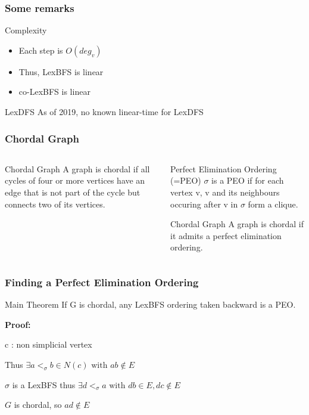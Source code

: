 \documentclass{beamer}
\begin{document}
\begin{frame}\frametitle{Some remarks}
    \begin{block}{Complexity}
	\begin{itemize}
	    \item Each step is $O(deg_{v})$
            \item Thus, LexBFS is linear
	    \item co-LexBFS is linear
	\end{itemize}
    \end{block}
    \begin{alertblock}{LexDFS}
	As of 2019, no known linear-time for LexDFS
    \end{alertblock}
\end{frame}

\begin{frame}\frametitle{Chordal Graph}

\begin{columns}[T] %
\begin{column}{.48\textwidth}

	\begin{block}{Chordal Graph}
		A graph is chordal if all cycles of four or more vertices have an edge that is not part of the cycle but connects two of its vertices.
	\end{block}

\end{column}%
\hfill%
\begin{column}{.48\textwidth}

	\begin{block}{Perfect Elimination Ordering (=PEO)}
	$\sigma$ is a PEO if for each vertex v, v and its neighbours occuring after v in $\sigma$ form a clique.
	\end{block}

	\begin{block}{Chordal Graph}
		A graph is chordal if it admits a perfect elimination ordering.
	\end{block}
\end{column}
\end{columns}
\end{frame}


\begin{frame}\frametitle{Finding a Perfect Elimination Ordering}
	\begin{block}{Main Theorem}
		If G is chordal, any LexBFS ordering taken backward is a PEO.
	\end{block}

	\textbf{Proof:}

	c : non simplicial vertex

	Thus $\exists a <_{\sigma} b \in N(c)\text{ with }ab \notin E$

	$\sigma$ is a LexBFS thus $\exists d <_{\sigma} a\text{ with }db \in E, dc \notin E$

	$G$ is chordal, so $ad \notin E$
\end{frame}
\end{document}
